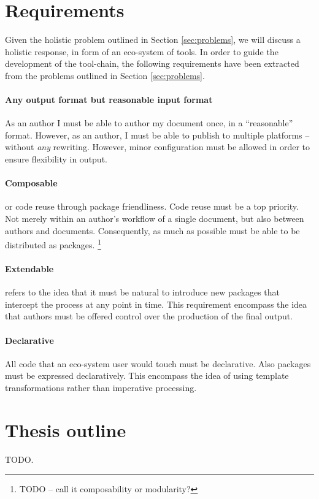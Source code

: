 \documentclass{scrreprt}
\begin{document}
\section{Requirements}
Given the holistic problem outlined in Section \ref{sec:problems}, we will discuss a holistic response, in form of an eco-system of tools. In order to guide the development of the tool-chain, the following requirements have been extracted from the problems outlined in Section \ref{sec:problems}.

\paragraph{Any output format but reasonable input format}
As an author I must be able to author my document once, in a ``reasonable'' format. However, as an author, I must be able to publish to multiple platforms -- without \emph{any} rewriting. However, minor configuration must be allowed in order to ensure flexibility in output.

\paragraph{Composable} or code reuse through package friendliness. Code reuse must be a top priority. Not merely within an author's workflow of a single document, but also between authors and documents. Consequently, as much as possible must be able to be distributed as packages. \footnote{TODO -- call it composability or modularity?}

\paragraph{Extendable} refers to the idea that it must be natural to introduce new packages that intercept the process at any point in time. This requirement encompass the idea that authors must be offered control over the production of the final output.

\paragraph{Declarative}
All code that an eco-system user would touch must be declarative. Also packages must be expressed declaratively. This encompass the idea of using template transformations rather than imperative processing.




\section{Thesis outline}
TODO.
\end{document}
